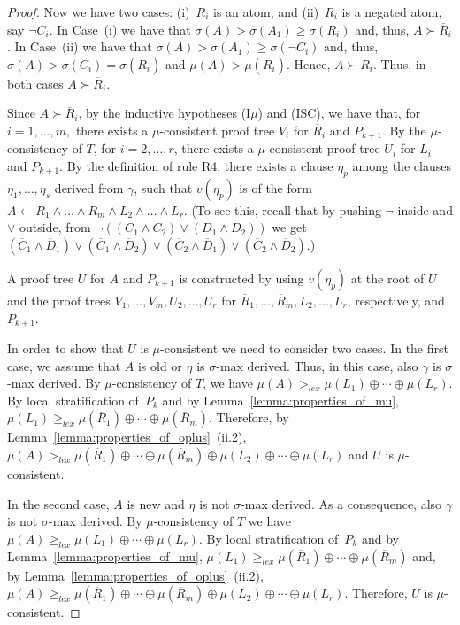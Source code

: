 \documentclass[english]{tlp}
\newcommand{\If}{\leftarrow}
\renewcommand{\mathit}{\displaystyle}
\begin{document}
\begin{proof}
Now we have two cases: (i)~$R_i$ is an atom, and (ii)~$R_i$ is a 
negated atom, say $\neg C_i$. 
In Case~(i) we have that $\sigma(A)>\sigma(A_1)\geq\sigma(R_i)$ and,
thus, $A\succ \overline R_i$. In Case~(ii) we have that 
$\sigma(A)>\sigma(A_1)\geq\sigma(\neg C_i)$  and, thus,
$\sigma(A)>\sigma(C_i)=\sigma(\overline R_i)$ and 
$\mu(A)>\mu(\overline R_i)$. Hence, 
$A \succ\overline R_i$.
Thus, in both cases $A \succ\overline R_i$.

Since $A \succ \overline R_i$,
 by the inductive hypotheses (I$\mu$) and (ISC), we have that,
for \( i=1,\ldots ,m,\) there exists a $\mu$-consistent proof tree
\(V_{i} \) for $\overline R_i$ and \( P_{k+1} \). By the
$\mu$-consistency of $T$, for \( i=2,\ldots ,r \), there exists a
$\mu$-consistent proof tree \(U_i \) for \(L_{i} \) and \( P_{k+1}
\). By the definition of rule R4, there exists a clause $\eta_p$
among the clauses $\eta_1,\ldots,\eta_s$ derived from $\gamma$, such
that $v(\eta_p)$ is of the form $A \If \overline R_1 \wedge \ldots
\wedge \overline R_m \wedge L_2 \wedge \ldots \wedge L_r$. 
(To see this, recall that by pushing $\neg$ inside and $\vee$ outside, from 
$\neg((C_1\wedge C_2)\vee (D_1\wedge D_2))$ we get 
$(\overline C_1\wedge \overline D_1)\vee (\overline C_1\wedge 
\overline D_2)\vee (\overline C_2\wedge \overline D_1)\vee 
(\overline C_2\wedge \overline D_2)$.)


A proof tree $U$ for $A$ and $ P_{k+1}$ is constructed by using $v(\eta_p)$ 
at the root of $U$ and
the proof trees $V_1,\ldots,V_m,U_2,\ldots,U_r$ for $\overline R_1, \ldots,
\overline R_m,L_2,\ldots,L_r$,  respectively, and $P_{k+1}$.

In order to show that $U$ is $\mu$-consistent
we need to consider two cases. 
In the first case, we assume that $A$ is old or
$\eta$ is $\sigma$-max derived. Thus, in this case, also $\gamma$ is $\sigma$-max derived.
By $\mu$-consistency of $T$, we have $\mu(A)>_{\mathit
lex}\mu(L_1)\oplus\cdots\oplus\mu(L_r)$. By local stratification of~$P_k$ and by
Lemma~\ref{lemma:properties_of_mu}, $\mu(L_1) \geq_{\mathit
lex}\mu(\overline{R}_1)\oplus\cdots\oplus\mu(\overline{R}_m)$. Therefore, by
Lemma~\ref{lemma:properties_of_oplus}~(ii.2), $\mu(A)>_{\mathit
lex}\mu(\overline{R}_1)\oplus\cdots\oplus\mu(\overline{R}_m
)\oplus\mu(L_2)\oplus\cdots\oplus\mu(L_r)$ and $U$ is $\mu$-consistent.

In the second case, $A$ is new and $\eta$ is not $\sigma$-max derived. As a
consequence, also $\gamma$ is not $\sigma$-max derived. By $\mu$-consistency of
$T$ we have $\mu(A)\geq_{\mathit lex}\mu(L_1)\oplus\cdots\oplus\mu(L_r)$.
By local stratification of~$P_k$ and  by Lemma~\ref{lemma:properties_of_mu}, $\mu(L_1) \geq_{\mathit
lex}\mu(\overline{R}_1)\oplus\cdots\oplus\mu(\overline{R}_m)$ and, by
Lemma~\ref{lemma:properties_of_oplus}~(ii.2), $\mu(A)\geq_{\mathit
lex}\mu(\overline{R}_1)\oplus\cdots\oplus\mu(\overline{R}_m
)\oplus\mu(L_2)\oplus\cdots\oplus\mu(L_r)$. Therefore, $U$ is $\mu$-consistent.


\end{proof}
\end{document}
